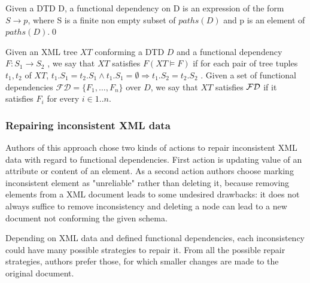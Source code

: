 \begin{define}
Given a DTD D, a functional dependency on D is an expression of the form $S \rightarrow p$, where S is a finite non empty subset of $paths(D)$ and p is an element of $paths(D)$.\qed
\end{define}

Given an XML tree $XT$ conforming a DTD $D$ and a functional dependency $F : S_1 \rightarrow S_2$ , we say that $XT$ satisfies $F (XT \models F )$ if for each pair of tree tuples $t_1, t_2$ of $XT$, $t_1.S_1 = t_2.S_1 \land t_1.S_1 = \emptyset \Rightarrow t_1.S_2 = t_2.S_2$ . Given a set of functional dependencies $\mathcal{FD} = \{F_1 , \dots, F_n\}$ over $D$, we say that $XT$ satisfies $\cal FD$ if it satisfies $F_i$ for every $i \in 1..n$.

\subsubsection{Repairing inconsistent XML data}

Authors of this approach chose two kinds of actions to repair inconsistent XML data with regard to functional dependencies. First action is updating value of an attribute or content of an element. As a second action authors choose marking inconsistent element as "unreliable" rather than deleting it, because removing elements from a XML document leads to some undesired drawbacks: it does not always suffice to remove inconsistency and deleting a node can lead to a new document not conforming the given schema.

Depending on XML data and defined functional dependencies, each inconsistency could have many possible strategies to repair it. From all the possible repair strategies, authors prefer those, for which smaller changes are made to the original document.

